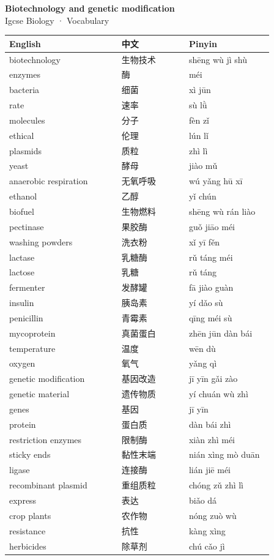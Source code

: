 \documentclass[11pt]{article}
\begin{document}
\begin{center}
  {\LARGE\bfseries Biotechnology and genetic modification}\\[0.35em]
  {\large Igcse Biology · Vocabulary}
\end{center}
\vspace{0.6em}

\begin{longtable}{@{}p{0.40\linewidth}p{0.24\linewidth}p{0.30\linewidth}@{}}
\toprule
\textbf{English} & \textbf{中文} & \textbf{Pinyin} \\
\midrule
\endhead
\bottomrule
\endlastfoot
biotechnology & 生物技术 & shēng wù jì shù \\
enzymes & 酶 & méi \\
bacteria & 细菌 & xì jūn \\
rate & 速率 & sù lǜ \\
molecules & 分子 & fèn zǐ \\
ethical & 伦理 & lún lǐ \\
plasmids & 质粒 & zhì lì \\
yeast & 酵母 & jiào mǔ \\
anaerobic respiration & 无氧呼吸 & wú yǎng hū xī \\
ethanol & 乙醇 & yǐ chún \\
biofuel & 生物燃料 & shēng wù rán liào \\
pectinase & 果胶酶 & guǒ jiāo méi \\
washing powders & 洗衣粉 & xǐ yī fěn \\
lactase & 乳糖酶 & rǔ táng méi \\
lactose & 乳糖 & rǔ táng \\
fermenter & 发酵罐 & fā jiào guàn \\
insulin & 胰岛素 & yí dǎo sù \\
penicillin & 青霉素 & qīng méi sù \\
mycoprotein & 真菌蛋白 & zhēn jūn dàn bái \\
temperature & 温度 & wēn dù \\
oxygen & 氧气 & yǎng qì \\
genetic modification & 基因改造 & jī yīn gǎi zào \\
genetic material & 遗传物质 & yí chuán wù zhì \\
genes & 基因 & jī yīn \\
protein & 蛋白质 & dàn bái zhì \\
restriction enzymes & 限制酶 & xiàn zhì méi \\
sticky ends & 黏性末端 & nián xìng mò duān \\
ligase & 连接酶 & lián jiē méi \\
recombinant plasmid & 重组质粒 & chóng zǔ zhì lì \\
express & 表达 & biǎo dá \\
crop plants & 农作物 & nóng zuò wù \\
resistance & 抗性 & kàng xìng \\
herbicides & 除草剂 & chú cǎo jì \\
\end{longtable}
\end{document}

